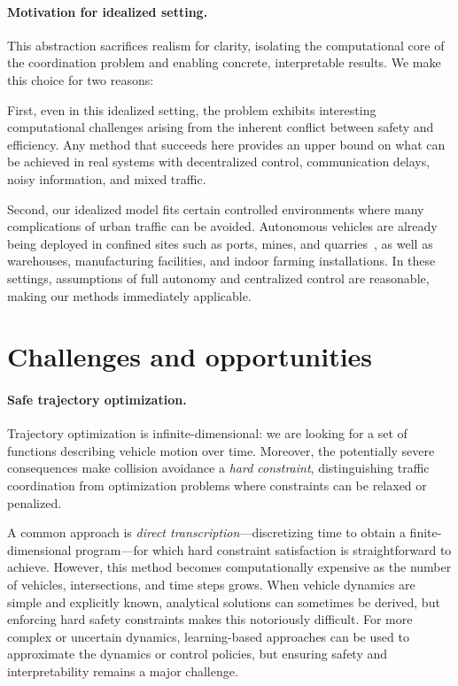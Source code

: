 \documentclass[a4paper]{report}
\theoremstyle{definition}
\theoremstyle{plain}
\begin{document}
\paragraph{Motivation for idealized setting.}

This abstraction sacrifices realism for clarity, isolating the computational
core of the coordination problem and enabling concrete, interpretable results.
We make this choice for two reasons:

First, even in this idealized setting, the problem exhibits interesting
computational challenges arising from the inherent conflict between safety and
efficiency.
%
Any method that succeeds here provides an upper bound on what can be
achieved in real systems with decentralized control, communication delays, noisy
information, and mixed traffic.

Second, our idealized model fits certain controlled environments where many
complications of urban traffic can be avoided. Autonomous vehicles are already
being deployed in confined sites such as ports, mines, and
quarries~\cite{kojchevOptimizationBasedCoordination2024}, as well as warehouses,
manufacturing facilities, and indoor farming installations. In these settings,
assumptions of full autonomy and centralized control are reasonable, making our
methods immediately applicable.


\section{Challenges and opportunities}

\paragraph{Safe trajectory optimization.}

Trajectory optimization is infinite-dimensional: we are looking for a set of
functions describing vehicle motion over time. Moreover, the potentially severe
consequences make collision avoidance a \emph{hard constraint}, distinguishing
traffic coordination from optimization problems where constraints can be relaxed
or penalized.

A common approach is \emph{direct transcription}---discretizing time to obtain a
finite-dimensional program---for which hard constraint satisfaction is
straightforward to achieve. However, this method becomes computationally
expensive as the number of vehicles, intersections, and time steps grows.
%
When vehicle dynamics are simple and explicitly known, analytical solutions can sometimes be derived, but enforcing hard safety constraints makes this notoriously difficult. For more complex or uncertain dynamics, learning-based approaches can be used to approximate the dynamics or control policies, but ensuring safety and interpretability remains a major challenge.
\end{document}
